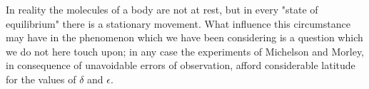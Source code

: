 In reality the molecules of a body are not at rest, but in every "state of equilibrium" there is a stationary movement. What influence this circumstance may have in the phenomenon which we have been considering is a question which we do not here touch upon; in any case the experiments of Michelson and Morley, in consequence of unavoidable errors of observation, afford considerable latitude for the values of $\delta$ and $\epsilon$.

